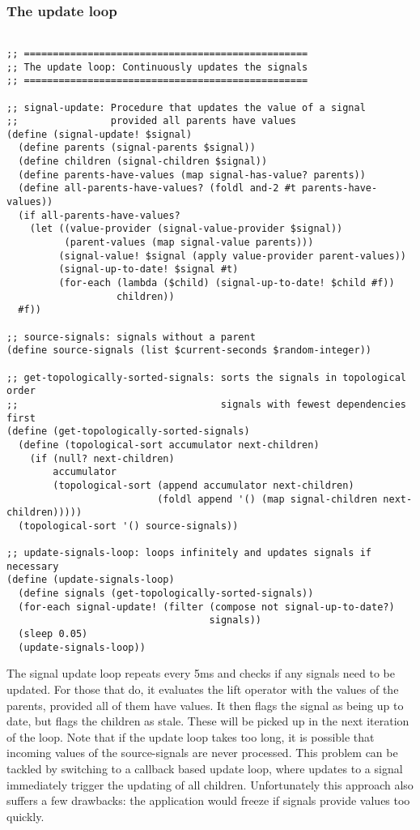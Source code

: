 \subsubsection{The update loop}
\begin{lstlisting}

;; =================================================
;; The update loop: Continuously updates the signals
;; =================================================

;; signal-update: Procedure that updates the value of a signal
;;                provided all parents have values
(define (signal-update! $signal)
  (define parents (signal-parents $signal))
  (define children (signal-children $signal))
  (define parents-have-values (map signal-has-value? parents))
  (define all-parents-have-values? (foldl and-2 #t parents-have-values))
  (if all-parents-have-values?
    (let ((value-provider (signal-value-provider $signal))
          (parent-values (map signal-value parents)))
         (signal-value! $signal (apply value-provider parent-values))
         (signal-up-to-date! $signal #t)
         (for-each (lambda ($child) (signal-up-to-date! $child #f))
                   children))
  #f))
  
;; source-signals: signals without a parent
(define source-signals (list $current-seconds $random-integer))
  
;; get-topologically-sorted-signals: sorts the signals in topological order
;;                                   signals with fewest dependencies first
(define (get-topologically-sorted-signals)
  (define (topological-sort accumulator next-children)
    (if (null? next-children)
        accumulator
        (topological-sort (append accumulator next-children) 
                          (foldl append '() (map signal-children next-children)))))
  (topological-sort '() source-signals))
  
;; update-signals-loop: loops infinitely and updates signals if necessary
(define (update-signals-loop)
  (define signals (get-topologically-sorted-signals))
  (for-each signal-update! (filter (compose not signal-up-to-date?) 
                                   signals))
  (sleep 0.05)
  (update-signals-loop))
\end{lstlisting}

The signal update loop repeats every 5ms and checks if any signals need to be updated. 
For those that do, it evaluates the lift operator with the values of the parents, provided all of them have values. It then flags the signal as being up to date, but flags the children as stale. These will be picked up in the next iteration of the loop. Note that if the update loop takes too long, it is possible that incoming values of the source-signals are never processed. This problem can be tackled by switching to a callback based update loop, where updates to a signal immediately trigger the updating of all children. Unfortunately this approach also suffers a few drawbacks: the application would freeze if signals provide values too quickly.

